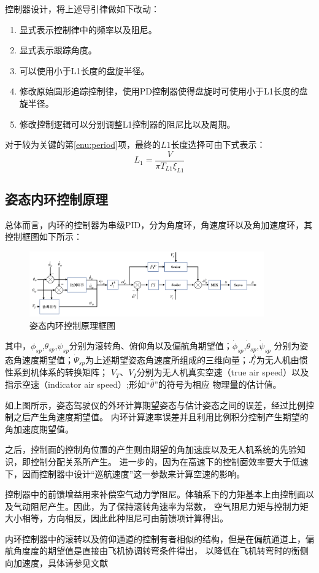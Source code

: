 控制器设计，将上述导引律做如下改动：
\begin{enumerate}
    \item 显式表示控制律中的频率以及阻尼。
    \item 显式表示跟踪角度。
    \item 可以使用小于L1长度的盘旋半径。
    \item 修改原始圆形追踪控制律，使用PD控制器使得盘旋时可使用小于L1长度的盘旋半径。
    \item 修改控制逻辑可以分别调整L1控制器的阻尼比以及周期。\label{enu:period}
\end{enumerate}
对于较为关键的第\ref{enu:period}项，最终的$L1$长度选择可由下式表示：
 \begin{equation}
     L_1 = \frac{V}{\pi T_{L1} \xi_{L1}}
\end{equation}
\subsection{姿态内环控制原理}
总体而言，内环的控制器为串级PID，分为角度环，角速度环以及角加速度环，其控制框图如下所示：
\begin{figure}[H]
    \centering
    \includegraphics[width=0.90\textwidth]{figures/c3/attitude_inner_loop}
    \caption{姿态内环控制原理框图}\label{c3-attitude_inner_loop}
\end{figure}
其中，$\phi_{sp}$,$\theta_{sp}$,$\psi_{sp}$分别为滚转角、俯仰角以及偏航角期望值；$\dot{\phi}_{sp}$,$\dot{\theta}_{sp}$,$\dot{\psi}_{sp}$
分别为姿态角速度期望值；$\dot{\Psi}_{sp}$为上述期望姿态角速度所组成的三维向量；$J^{b}_l$为无人机由惯性系到机体系的转换矩阵；
$V_T$、$V_I$分别为无人机真实空速（true air speed）以及指示空速（indicator air speed）;形如“$\hat{\theta}$”的符号为相应
物理量的估计值。

如上图所示，姿态驾驶仪的外环计算期望姿态与估计姿态之间的误差，经过比例控制之后产生角速度期望值。
内环计算速率误差并且利用比例积分控制产生期望的角加速度期望值。

之后，控制面的控制角位置的产生则由期望的角加速度以及无人机系统的先验知识，即控制分配关系所产生。
进一步的，因为在高速下的控制面效率要大于低速下，因而控制器中设计“巡航速度”这一参数来计算空速的影响。

控制器中的前馈增益用来补偿空气动力学阻尼。体轴系下的力矩基本上由控制面以及气动阻尼产生。因此，为了保持滚转角速率为常数，
空气阻尼力矩与控制力矩大小相等，方向相反，因此此种阻尼可由前馈项计算得出。

内环控制器中的滚转以及俯仰通道的控制有者相似的结构，但是在偏航通道上，偏航角度度的期望值是直接由飞机协调转弯条件得出，
以降低在飞机转弯时的衡侧向加速度，具体请参见文献\cite{Fangzhenping2005}
